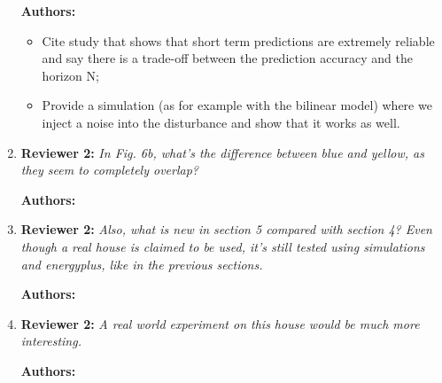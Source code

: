 \documentclass{article}
\begin{document}
\begin{enumerate}
\textbf{Authors:} 

	\begin{itemize}
		\item Cite study that shows that short term predictions are extremely reliable and say there is a trade-off between the prediction accuracy and the horizon N;
		\item Provide a simulation (as for example with the bilinear model) where we inject a noise into the disturbance and show that it works as well.
	\end{itemize}

\item \textbf{Reviewer 2:} \textit{In Fig. 6b, what's the difference between blue and yellow, as they seem to completely overlap?}

\textbf{Authors:} 

\item \textbf{Reviewer 2:} \textit{Also, what is new in section 5 compared with section 4? Even though a real house is claimed to be used, it's still tested using simulations and energyplus, like in the previous sections.}

\textbf{Authors:} 

\item \textbf{Reviewer 2:} \textit{A real world experiment on this house would be much more interesting.}

\textbf{Authors:} 

\end{enumerate}
%

%
\end{document}
